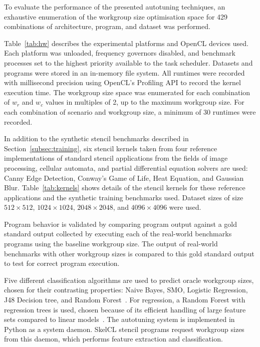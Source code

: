 \documentclass[preprint,nonatbib,10pt,nocopyrightspace]{sigplanconf}
\begin{document}
  To evaluate the performance of the presented autotuning techniques, an
  exhaustive enumeration of the workgroup size optimisation space for 429
  combinations of architecture, program, and dataset was performed.

  Table~\ref{tab:hw} describes the experimental platforms and OpenCL devices used.
  Each platform was unloaded, frequency governors disabled, and benchmark
  processes set to the highest priority available to the task scheduler. Datasets
  and programs were stored in an in-memory file system. All runtimes were recorded
  with millisecond precision using OpenCL's Profiling API to record the kernel
  execution time. The workgroup size space was enumerated for each combination of
  $w_r$ and $w_c$ values in multiples of 2, up to the maximum workgroup size. For
  each combination of scenario and workgroup size, a minimum of 30 runtimes were
  recorded.

  In addition to the synthetic stencil benchmarks described in
  Section~\ref{subsec:training}, six stencil kernels taken from four reference
  implementations of standard stencil applications from the fields of image
  processing, cellular automata, and partial differential equation solvers are
  used: Canny Edge Detection, Conway's Game of Life, Heat Equation, and Gaussian
  Blur. Table~\ref{tab:kernels} shows details of the stencil kernels for these
  reference applications and the synthetic training benchmarks used. Dataset sizes
  of size $512\times512$, $1024\times1024$, $2048\times2048$, and $4096\times4096$
  were used.

  Program behavior is validated by comparing program output against a gold
  standard output collected by executing each of the real-world benchmarks
  programs using the baseline workgroup size. The output of real-world benchmarks
  with other workgroup sizes is compared to this gold standard output to test for
  correct program execution.

  Five different classification algorithms are used to predict oracle workgroup
  sizes, chosen for their contrasting properties: Naive Bayes, SMO, Logistic
  Regression, J48 Decision tree, and Random Forest~\cite{Han2011}. For regression,
  a Random Forest with regression trees is used, chosen because of its efficient
  handling of large feature sets compared to linear models~\cite{Breiman1999}. The
  autotuning system is implemented in Python as a system daemon. SkelCL stencil
  programs request workgroup sizes from this daemon, which performs feature
  extraction and classification.
\end{document}
